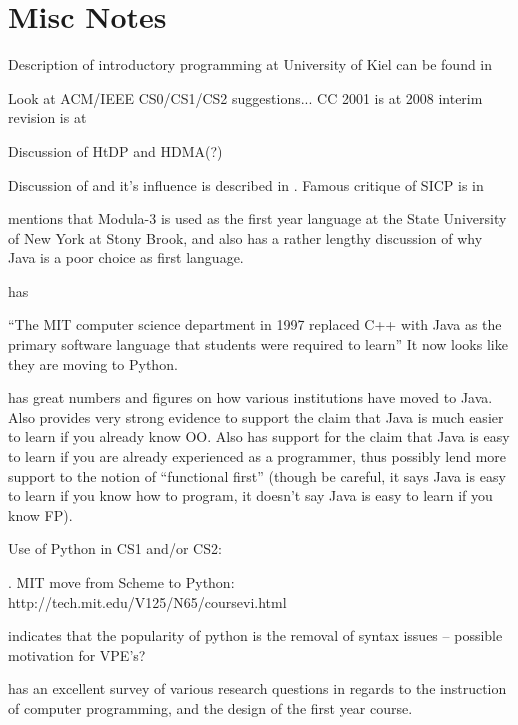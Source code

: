 \label{chapter:problem}

\section{Misc Notes}

Description of introductory programming at University of Kiel can be found in \cite{Huch05}

Look at ACM/IEEE CS0/CS1/CS2 suggestions...  CC 2001 is at \cite{cc2001} 2008 interim revision is at \cite{cs2008}

Discussion of HtDP and HDMA(?)

Discussion of \cite{SICPbook} and it's influence is described in \cite{Flatt04}.  Famous critique of SICP is in \cite{Wadler87}

\cite{Bos98} mentions that Modula-3 is used as the first year language at the State University of New York at Stony Brook, and also has a rather lengthy discussion of why Java is a poor choice as first language.

\cite{Mahmoud04} has 


``The MIT computer science department in 1997 replaced C++ with Java as the primary software language that students were required to learn'' \cite{Benander04}  It now looks like they are moving to Python.

\cite{Benander04} has great numbers and figures on how various institutions have moved to Java.  Also provides very strong evidence to support the claim that Java is much easier to learn if you already know OO.  Also has support for the claim that Java is easy to learn if you are already experienced as a programmer, thus possibly lend more support to the notion of ``functional first'' (though be careful, it says Java is easy to learn if you know how to program, it doesn't say Java is easy to learn if you know FP).


Use of Python in CS1 and/or CS2:

\cite{Radenski06,Shannon03,Agarwal05,Agarwal08}.  MIT move from Scheme to Python: http://tech.mit.edu/V125/N65/coursevi.html

\cite{Necaise08} indicates that the popularity of python is the removal of syntax issues -- possible motivation for VPE's?

\cite{Pears07} has an excellent survey of various research questions in regards to the instruction of computer programming, and the design of the first year course.





